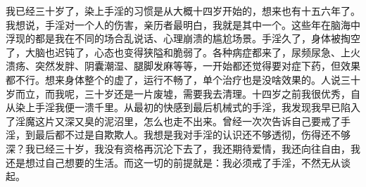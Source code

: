 \begin{case}
    我已经三十岁了，染上手淫的习惯是从大概十四岁开始的，想来也有十五六年了。我想说，手淫对一个人的伤害，亲历者最明白，我就是其中一个。这些年在脑海中浮现的都是我在不同的场合乱说话、心理崩溃的尴尬场景。手淫久了，身体被掏空了，大脑也迟钝了，心态也变得狭隘和脆弱了。各种病症都来了，尿频尿急、上火溃疡、突然发胖、阴囊潮湿、腿脚发麻等等，一开始都还觉得要对症下药，但效果都不行。想来身体整个的虚了，运行不畅了，单个治疗也是没啥效果的。人说三十岁而立，而我呢，三十岁还是一片废墟，需要我去清理。十四岁之前我很优秀，自从染上手淫我便一溃千里。从最初的快感到最后机械式的手淫，我发现我早已陷入了淫魔这片又深又臭的泥沼里，怎么也走不出来。曾经一次次告诉自己要戒了手淫，到最后都不过是自欺欺人。我想是我对手淫的认识还不够透彻，伤得还不够深？我已经三十岁，我没有资格再沉沦下去了，我还期待爱情，我还向往自由，我还是想过自己想要的生活。而这一切的前提就是：我必须戒了手淫，不然无从谈起。


\end{case}
